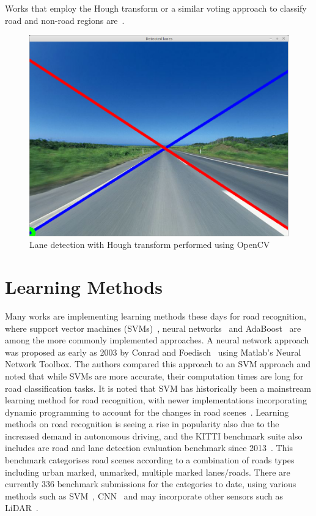 Works that employ the Hough transform or a similar voting approach to classify road and non-road regions are~\cite{h._kong_general_2010, abbas_novel_2016, zhu_visual_2014}.

\begin{figure}[H]
	\centering
	\includegraphics[width=0.5\linewidth]{lane_detection.png}
	\caption{\label{fig:lanedetect}Lane detection with Hough transform performed using OpenCV}
\end{figure}

\section{Learning Methods} \label{seclearning}
Many works are implementing learning methods these days for road recognition, where support vector machines (SVMs)~\cite{shengyan_self-supervised_2010,jian_unstructured_2009}, neural networks~\cite{m._foedisch_adaptive_2004} and AdaBoost~\cite{cord_automatic_2012} are among the more commonly implemented approaches. A neural network approach was proposed as early as 2003 by Conrad and Foedisch~\cite{p._conrad_performance_2003} using Matlab's Neural Network Toolbox. The authors compared this approach to an SVM approach and noted that while SVMs are more accurate, their computation times are long for road classification tasks. It is noted that SVM has historically been a mainstream learning method for road recognition, with newer implementations incorporating dynamic programming to account for the changes in road scenes~\cite{j._yao_estimating_2015}. Learning methods on road recognition is seeing a rise in popularity also due to the increased demand in autonomous driving, and the KITTI benchmark suite also includes are road and lane detection evaluation benchmark since 2013~\cite{jannik_fritsch_new_2013}. This benchmark categorises road scenes according to a combination of roads types including urban marked, unmarked, multiple marked lanes/roads. There are currently 336 benchmark submissions for the categories to date, using various methods such as SVM~\cite{d._a._chacra_road_2016}, CNN~\cite{oliveira_efficient_2016,mendes_exploiting_2016} and may incorporate other sensors such as LiDAR~\cite{caltagirone_fast_2017}.

